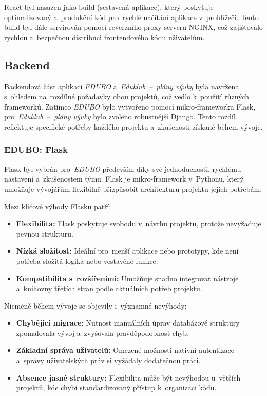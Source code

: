 \documentclass[male,czech,api_bc]{kitheses}
\begin{document}
React byl nasazen jako build (sestavená aplikace), který poskytuje optimalizovaný a~produkční kód pro~rychlé načítání aplikace v~prohlížeči. Tento build byl dále servírován pomocí reverzního proxy serveru NGINX, což zajišťovalo rychlou a~bezpečnou distribuci frontendového kódu uživatelům.

\subsection{Backend}

Backendová část aplikací \textit{EDUBO} a~\textit{Eduklub~--~plány výuky} byla navržena s~ohledem na~rozdílné požadavky obou projektů, což vedlo k~použití různých frameworků. Zatímco \textit{EDUBO} bylo vytvořeno pomocí mikro-frameworku Flask, pro~\textit{Eduklub~--~plány výuky} bylo zvoleno robustnější Django. Tento rozdíl reflektuje specifické potřeby každého projektu a~zkušenosti získané během vývoje.

\subsubsection{EDUBO: Flask}

Flask byl vybrán pro~\textit{EDUBO} především díky své jednoduchosti, rychlému nastavení a~zkušenostem týmu. Flask je mikro-framework v~Pythonu, který umožňuje vývojářům flexibilně přizpůsobit architekturu projektu jejich potřebám.

Mezi klíčové výhody Flasku patří:
\begin{itemize}
	\item \textbf{Flexibilita:} Flask poskytuje svobodu v~návrhu projektu, protože nevyžaduje pevnou strukturu.
	\item \textbf{Nízká složitost:} Ideální pro~menší aplikace nebo prototypy, kde není potřeba složitá logika nebo vestavěné funkce.
	\item \textbf{Kompatibilita s~rozšířeními:} Umožňuje snadno integrovat nástroje a~knihovny třetích stran podle aktuálních potřeb projektu.
\end{itemize}

Nicméně během vývoje se objevily i~významné nevýhody:
\begin{itemize}
	\item \textbf{Chybějící migrace:} Nutnost manuálních úprav databázové struktury zpomalovala vývoj a~zvyšovala pravděpodobnost chyb.
	\item \textbf{Základní správa uživatelů:} Omezené možnosti nativní autentizace a~správy uživatelských práv si vyžádaly dodatečnou práci.
	\item \textbf{Absence jasné struktury:} Flexibilita může být nevýhodou u~větších projektů, kde chybí standardizovaný přístup k~organizaci kódu.
\end{itemize}
\end{document}
